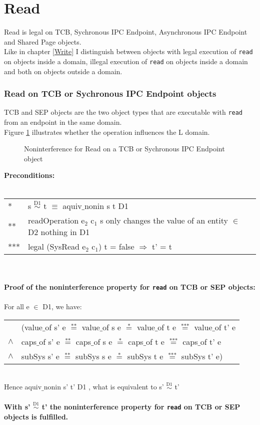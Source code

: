 \section{Read}\label{sec:Read}
Read is legal on TCB, Sychronous IPC Endpoint, Asynchronous IPC Endpoint and Shared Page objects. \\
Like in chapter \ref{Write} I distinguish between objects with legal execution of \texttt{read} on objects inside a domain, illegal execution of \texttt{read} on objects inside a domain and both on objects outside a domain.
\subsubsection{Read on TCB or Sychronous IPC Endpoint objects}
TCB and SEP objects are the two object types that are executable with \texttt{read} from an endpoint in the same domain. \\
Figure \ref{fig:ReadTCB} illustrates whether the operation influences the L domain.
\begin{figure}[H]
\caption{Noninterference for Read on a TCB or Sychronous IPC Endpoint object}
\label{fig:ReadTCB}
\end{figure}
\textbf{Preconditions:} \\ \\
\begin{tabular}{ll}
* & s $\overset{\text{D1}}{\sim}$ t $\equiv$ aquiv$\_$nonin s t D1	\\ 
** & readOperation e$_2$ c$_1$ s only changes the value of an entity $\in$ D2 nothing in D1 \\ 
*** & legal (SysRead e$_2$ c$_1$) t = false $\Rightarrow$ t' = t
\end{tabular} \\ \\ 
\textbf{Proof of the noninterference property for \texttt{read} on TCB or SEP objects:}\\ \\
For all e $\in$ D1, we have: \\ 
\begin{tabular}{ll}
& (value$\_$of s' e $\overset{\text{**}}{=}$ value$\_$of s e $\overset{\text{*}}{=}$ value$\_$of t e $\overset{\text{***}}{=}$ value$\_$of t' e \\
$\wedge$ & caps$\_$of s' e $\overset{\text{**}}{=}$ caps$\_$of s e $\overset{\text{*}}{=}$ caps$\_$of t e $\overset{\text{***}}{=}$ caps$\_$of t' e \\
$\wedge$ & subSys s' e $\overset{\text{**}}{=}$ subSys s e $\overset{\text{*}}{=}$ subSys t e $\overset{\text{***}}{=}$ subSys t' e)
\end{tabular} \\
Hence aquiv$\_$nonin s' t' D1 , what is equivalent to s' $\overset{\text{D1}}{\sim}$ t' \\ \\
\textbf{With s' $\overset{\text{D1}}{\sim}$ t' the noninterference property for \texttt{read} on TCB or SEP objects is fulfilled.}  
